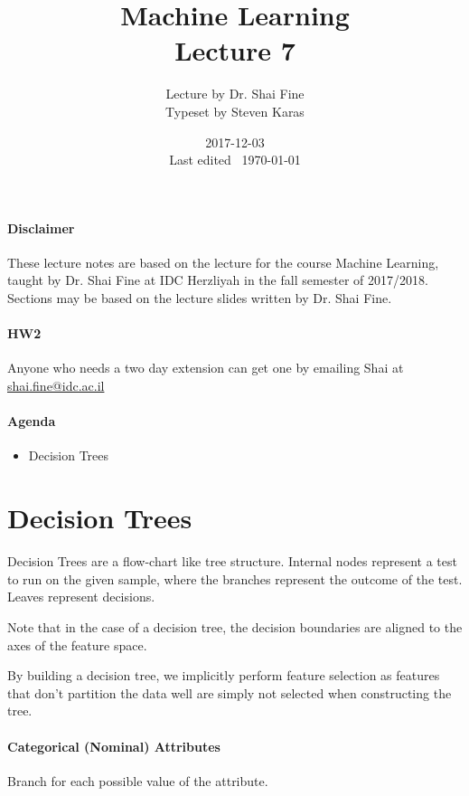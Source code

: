 \documentclass{idc_msc}
\title{Machine Learning\\\large Lecture 7}
\date{2017-12-03 \\ Last edited \currenttime\ \today}
\author{Lecture by Dr. Shai Fine\\Typeset by Steven Karas}
\begin{document}
\maketitle

\paragraph{Disclaimer}

These lecture notes are based on the lecture for the course Machine Learning, taught by Dr. Shai Fine at IDC Herzliyah in the fall semester of 2017/2018.
Sections may be based on the lecture slides written by Dr. Shai Fine.

\paragraph{HW2}

Anyone who needs a two day extension can get one by emailing Shai at \href{mailto:shai.fine@idc.ac.il}{shai.fine@idc.ac.il}

\paragraph{Agenda}

\begin{itemize}
  \item Decision Trees
\end{itemize}

\section{Decision Trees}

Decision Trees are a flow-chart like tree structure.
Internal nodes represent a test to run on the given sample, where the branches represent the outcome of the test.
Leaves represent decisions.

Note that in the case of a decision tree, the decision boundaries are aligned to the axes of the feature space.

By building a decision tree, we implicitly perform feature selection as features that don't partition the data well are simply not selected when constructing the tree.

\paragraph{Categorical (Nominal) Attributes}

Branch for each possible value of the attribute.
\end{document}
